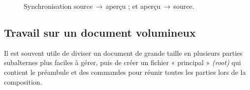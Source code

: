 \documentclass[11pt,french]{article}
\newcommand{\To}{\,\(\to\)\,}
\begin{document}
\begin{figure}
\centering
{}%
\hfill%
%
\caption[Source/Preview Synch.]{
 Synchronisation source\To aperçu ; et
 aperçu\To source.}
\label{fig:SourcePreviewSync}
\end{figure}

\subsection{Travail sur un document volumineux}

Il est souvent utile de diviser un document de grande taille en plusieurs parties subalternes plus faciles à gérer, puis de créer un fichier « principal » \emph{(root)} qui contient le préambule et des commandes \verb|| pour réunir toutes les parties lors de la composition.
\end{document}
